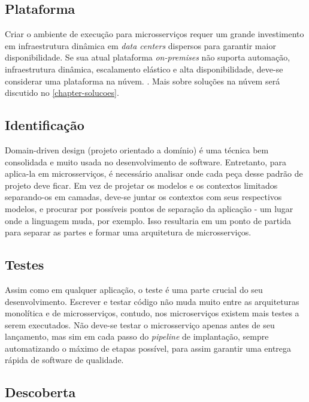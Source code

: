 \subsection{Plataforma}
Criar o ambiente de execução para microsserviços requer um grande investimento em infraestrutura dinâmica em \emph{data centers} dispersos para garantir maior disponibilidade. Se sua atual plataforma \emph{on-premises} não suporta automação, infraestrutura dinâmica, escalamento elástico e alta disponibilidade, deve-se considerar uma plataforma na núvem. \cite{Familiar2015}. Mais sobre soluções na núvem será discutido no \autoref{chapter-solucoes}.

\subsection{Identificação}

Domain-driven design (projeto orientado a domínio) é uma técnica bem consolidada e muito usada no desenvolvimento de software. Entretanto, para aplica-la em microsserviços, é necessário analisar onde cada peça desse padrão de projeto deve ficar. Em vez de projetar os modelos e os contextos limitados separando-os em camadas, deve-se juntar os contextos com seus respectivos modelos, e procurar por possíveis pontos de separação da aplicação - um lugar onde a linguagem muda, por exemplo. Isso resultaria em um ponto de partida para separar as partes e formar uma arquitetura de microsserviços. \cite{Familiar2015}


\subsection{Testes}

Assim como em qualquer aplicação, o teste é uma parte crucial do seu desenvolvimento. Escrever e testar código não muda muito entre as arquiteturas monolítica e de microsserviços, contudo, nos microserviços existem mais testes a serem executados. Não deve-se testar o microsserviço apenas antes de seu lançamento, mas sim em cada passo do \emph{pipeline} de implantação, sempre automatizando o máximo de etapas possível, para assim garantir uma entrega rápida de software de qualidade. \cite{Familiar2015}

\subsection{Descoberta}


